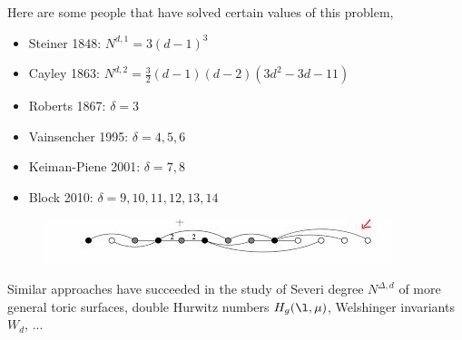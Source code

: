 \documentclass{article}
\begin{document}
\begin{eg} Here are some people that have solved certain values of this problem,
  \begin{itemize}
    \item Steiner 1848: $N^{d,1} = 3(d - 1)^3$
    \item Cayley 1863: $N^{d,2} = \frac{3}{2}(d - 1)(d-2)(3d^2 - 3d - 11)$
    \item Roberts 1867: $\delta = 3$
    \item Vainsencher 1995: $\delta = 4, 5, 6$
    \item Keiman-Piene 2001: $\delta = 7,8$
    \item Block 2010: $\delta = 9, 10, 11, 12, 13, 14$
  \end{itemize}
  \begin{figure}[!ht]
  \centering
  \includegraphics{./figures/L2.11}
  \end{figure}
\end{eg}

Similar approaches have succeeded in the study of Severi degree $N^{\Delta, d}$ of more general toric surfaces, double Hurwitz numbers $H_g(\l, \mu)$, Welshinger invariants $W_d$, ...
\end{document}
